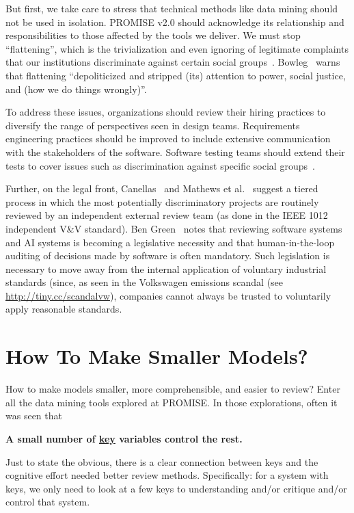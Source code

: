 \documentclass[sigconf,screen]{acmart}
\begin{document}
But first, we take care to stress that technical methods like data mining should not be used in isolation.
 PROMISE v2.0 should acknowledge its
   relationship and   responsibilities to those affected by the tools we deliver. We must stop ``flattening'', which is the trivialization and even ignoring of legitimate complaints that our institutions discriminate against certain social groups~\cite{Coaston19}. Bowleg~\cite{doi:10.2105/AJPH.2020.306031} warns that flattening ``depoliticized and stripped (its) attention to power, social justice, and (how we do things wrongly)''.
   
To address these issues, organizations should review their hiring practices to diversify the range of perspectives seen in design teams.  Requirements engineering practices should be improved to include extensive communication with the stakeholders of the software. 
 Software testing teams should extend their tests to cover issues such as discrimination against specific social groups~\cite{cruz2021promoting,10.1145/3585006,Chakraborty}. 
 
Further, on the legal front,
Canellas~\cite{canellas21} and Mathews et al.~\cite{matthewsshould} suggest a tiered process in which the most potentially discriminatory projects are routinely reviewed by an independent external review team
(as done in the IEEE 1012 independent V\&V standard). Ben Green~\cite{green2022flaws} notes that reviewing software systems and AI systems is becoming a legislative necessity and that human-in-the-loop auditing of decisions made by software is often mandatory.
Such legislation is necessary to move away from the internal application of voluntary industrial standards (since, as seen in the Volkswagen emissions scandal (see \url{http://tiny.cc/scandalvw}), companies cannot always be trusted
to voluntarily apply reasonable standards.  

 

\section{How To Make Smaller Models?}

How to make models smaller, more comprehensible, and easier to review?
 Enter all the data mining tools explored at PROMISE.
In those explorations, often it was seen that

 \centerline{\bf A small number of \underline{key} variables control the rest.}
 \noindent
Just to state the obvious, there is a clear
connection between  keys and the  cognitive effort needed  better review methods. Specifically: for a system
with keys, we only need to look
at a few keys to 
  understanding and/or critique and/or control  that system. 
\end{document}
